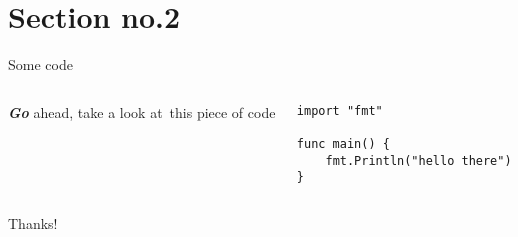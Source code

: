 \documentclass[xcolor=dvipsnames]{beamer}
\begin{document}
    \section{Section no.2}
    \begin{frame}[fragile]{Some code}
      \begin{columns}
      \begin{column}{0.4\textwidth}
        \textbf{\textit{Go}} ahead, take a look at~this piece of code
      \end{column}
      \begin{column}{0.6\textwidth}
        \begin{verbatim}
import "fmt"

func main() {
    fmt.Println("hello there")
}
        \end{verbatim}  
      \end{column}
      \end{columns}
    \end{frame}

    \appendix
    \begin{frame}
        \centering
        \fontsize{40}{50} \selectfont \color{solarizedOrange} Thanks!
    \end{frame}
\end{document}
